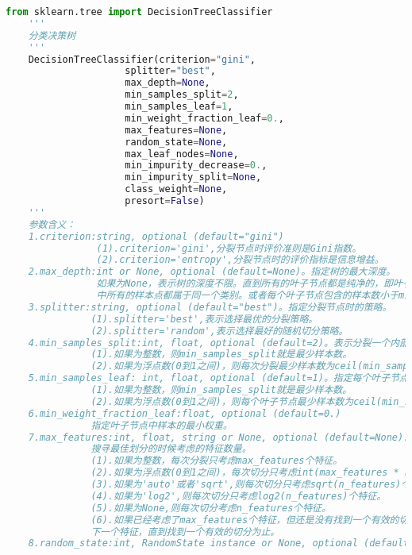 \documentclass[18pt,a4paper,oneside,UTF8]{ctexart}
\begin{document}
\begin{lstlisting}[language=python]
    from sklearn.tree import DecisionTreeClassifier
    '''
    分类决策树
    '''
    DecisionTreeClassifier(criterion="gini",
                     splitter="best",
                     max_depth=None,
                     min_samples_split=2,
                     min_samples_leaf=1,
                     min_weight_fraction_leaf=0.,
                     max_features=None,
                     random_state=None,
                     max_leaf_nodes=None,
                     min_impurity_decrease=0.,
                     min_impurity_split=None,
                     class_weight=None,
                     presort=False)
    '''
    参数含义：
    1.criterion:string, optional (default="gini")
                (1).criterion='gini',分裂节点时评价准则是Gini指数。
                (2).criterion='entropy',分裂节点时的评价指标是信息增益。
    2.max_depth:int or None, optional (default=None)。指定树的最大深度。
                如果为None，表示树的深度不限。直到所有的叶子节点都是纯净的，即叶子节点
                中所有的样本点都属于同一个类别。或者每个叶子节点包含的样本数小于min_samples_split。
    3.splitter:string, optional (default="best")。指定分裂节点时的策略。
               (1).splitter='best',表示选择最优的分裂策略。
               (2).splitter='random',表示选择最好的随机切分策略。
    4.min_samples_split:int, float, optional (default=2)。表示分裂一个内部节点需要的做少样本数。
               (1).如果为整数，则min_samples_split就是最少样本数。
               (2).如果为浮点数(0到1之间)，则每次分裂最少样本数为ceil(min_samples_split * n_samples)
    5.min_samples_leaf: int, float, optional (default=1)。指定每个叶子节点需要的最少样本数。
               (1).如果为整数，则min_samples_split就是最少样本数。
               (2).如果为浮点数(0到1之间)，则每个叶子节点最少样本数为ceil(min_samples_leaf * n_samples)
    6.min_weight_fraction_leaf:float, optional (default=0.)
               指定叶子节点中样本的最小权重。
    7.max_features:int, float, string or None, optional (default=None).
               搜寻最佳划分的时候考虑的特征数量。
               (1).如果为整数，每次分裂只考虑max_features个特征。
               (2).如果为浮点数(0到1之间)，每次切分只考虑int(max_features * n_features)个特征。
               (3).如果为'auto'或者'sqrt',则每次切分只考虑sqrt(n_features)个特征
               (4).如果为'log2',则每次切分只考虑log2(n_features)个特征。
               (5).如果为None,则每次切分考虑n_features个特征。
               (6).如果已经考虑了max_features个特征，但还是没有找到一个有效的切分，那么还会继续寻找
               下一个特征，直到找到一个有效的切分为止。
    8.random_state:int, RandomState instance or None, optional (default=None)

\end{lstlisting}
\end{document}

